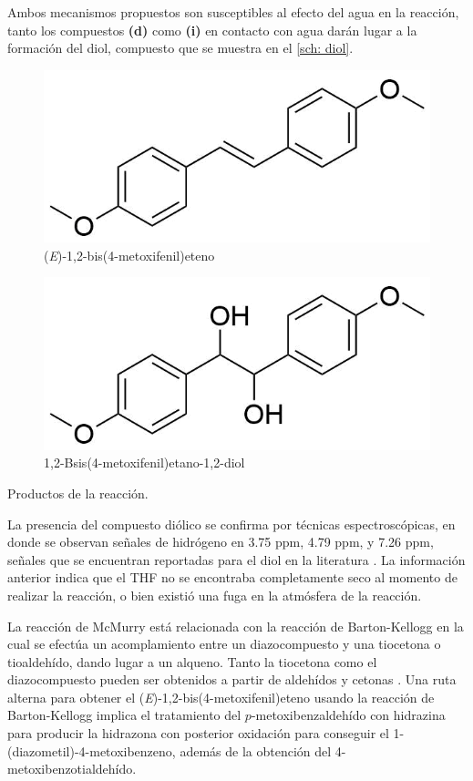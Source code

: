 \documentclass[fleqn,11pt]{SelfArx}
\begin{document}
\pagebreak
Ambos mecanismos propuestos son susceptibles al efecto del agua en la reacci\'on, tanto los compuestos \textbf{(d)} como \textbf{(i)} en contacto con agua dar\'an lugar a la formaci\'on del diol, compuesto que se muestra en el \autoref{sch: diol}.
\begin{scheme}[h]
	\centering
	\scriptsize
	\begin{subfigure}[t]{0.49\linewidth}
		\centering
		\includegraphics[width=0.9\linewidth]{structures/product.png}
		\caption{(\textit{E})-1,2-bis(4-metoxifenil)eteno}
		\label{sch: producto}
	\end{subfigure}
	\begin{subfigure}[t]{0.49\linewidth}
		\centering
		\includegraphics[width=0.9\linewidth]{structures/product2.png}
		\caption{1,2-Bsis(4-metoxifenil)etano-1,2-diol}
		\label{sch: diol}
	\end{subfigure}
	\caption{Productos de la reacci\'on.}
\end{scheme}

La presencia del compuesto di\'olico se confirma por t\'ecnicas espectrosc\'opicas, en donde se observan señales de hidr\'ogeno en 3.75 ppm, 4.79 ppm, y 7.26 ppm, señales que se encuentran reportadas para el diol en la literatura \cite{Uchiyama2004}. La informaci\'on anterior indica que el THF no se encontraba completamente seco al momento de realizar la reacci\'on, o bien existi\'o una fuga en la atm\'osfera de la reacci\'on.

La reacci\'on de McMurry est\'a relacionada con la reacci\'on de Barton-Kellogg en la cual se efect\'ua un acomplamiento entre un diazocompuesto y una tiocetona o tioaldeh\'ido, dando lugar a un alqueno. Tanto la tiocetona como el diazocompuesto pueden ser obtenidos a partir de aldeh\'idos y cetonas \cite{Barton1970, Kellogg1970, Wang2010}. Una ruta alterna para obtener el (\textit{E})-1,2-bis(4-metoxifenil)eteno usando la reacci\'on de Barton-Kellogg implica el tratamiento del $p$-metoxibenzaldeh\'ido con hidrazina para producir la hidrazona con posterior oxidaci\'on para conseguir el 1-(diazometil)-4-metoxibenzeno, adem\'as de la obtenci\'on del 4-metoxibenzotialdeh\'ido.
\end{document}
